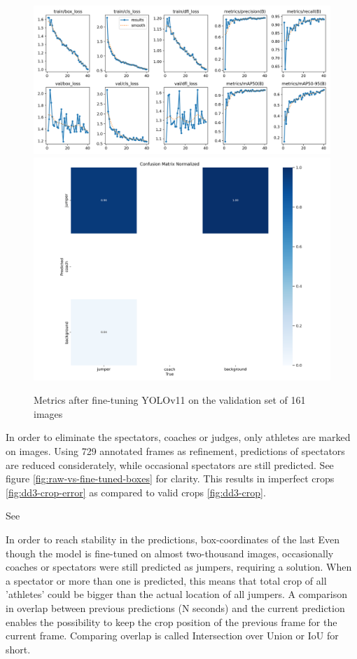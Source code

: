 \begin{figure}
    \centering
    \includegraphics[width=0.95\linewidth]{img/results}
    \includegraphics[width=0.85\linewidth]{img/confusion_matrix_normalized}
    \caption[metrics after fine-tuning YOLOv11]{Metrics after fine-tuning YOLOv11 on the validation set of 161 images}
    \label{fig:localization-results}
\end{figure}

In order to eliminate the spectators, coaches or judges, only athletes are marked on images. Using 729 annotated frames as refinement, predictions of spectators are reduced considerately, while occasional spectators are still predicted. See figure \ref{fig:raw-vs-fine-tuned-boxes} for clarity.
This results in imperfect crops \ref{fig:dd3-crop-error} as compared to valid crops \ref{fig:dd3-crop}.

See

In order to reach stability in the predictions, box-coordinates of the last
Even though the model is fine-tuned on almost two-thousand images, occasionally coaches or spectators were still predicted as jumpers, requiring a solution.
When a spectator or more than one is predicted, this means that total crop of all 'athletes' could be bigger than the actual location of all jumpers. A comparison in overlap between previous predictions (N seconds) and the current prediction enables the possibility to keep the crop position of the previous frame for the current frame. Comparing overlap is called Intersection over Union or IoU for short.

